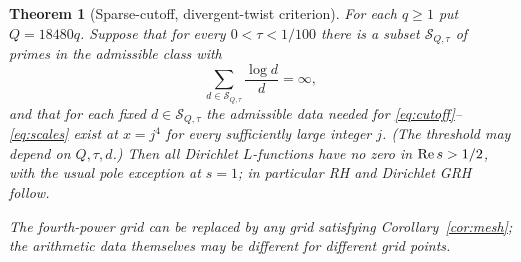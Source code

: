 \documentclass[11pt,a4paper]{article}
\newtheorem{theorem}{Theorem}[section]
\theoremstyle{remark}\newtheorem{remark}[theorem]{Remark}
\begin{document}
\begin{theorem}[Sparse-cutoff, divergent-twist criterion]\label{thm:criterion}
For each $q\ge1$ put $Q=18480q$. Suppose that for every $0<\tau<1/100$ there is a subset $\mathcal S_{Q,\tau}$ of primes in the admissible class with
\begin{equation}\label{eq:divergence}
\sum_{d\in\mathcal S_{Q,\tau}}\frac{\log d}{d}=\infty,
\end{equation}
and that for each fixed $d\in\mathcal S_{Q,\tau}$ the admissible data needed for \eqref{eq:cutoff}--\eqref{eq:scales} exist at $x=j^4$ for every sufficiently large integer $j$. (The threshold may depend on $Q,\tau,d$.) Then all Dirichlet $L$-functions have no zero in $\operatorname{Re} s>1/2$, with the usual pole exception at $s=1$; in particular RH and Dirichlet GRH follow.

The fourth-power grid can be replaced by any grid satisfying Corollary~\ref{cor:mesh}; the arithmetic data themselves may be different for different grid points.
\end{theorem}
\end{document}
